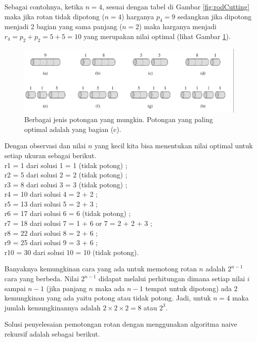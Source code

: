 Sebagai contohnya, ketika $n=4$, sesuai dengan tabel di Gambar \ref{fig:rodCutting} maka jika rotan tidak dipotong ($n=4$) harganya $p_4 = 9$ sedangkan jika dipotong menjadi 2 bagian yang sama panjang ($n=2$) maka harganya menjadi $r_4=p_2+p_2=5+5=10$ yang merupakan nilai optimal (lihat Gambar \ref{fig:rodCutting2}).   

\begin{figure}[H]%
\centering
\includegraphics[scale=0.7]{fig/rodCutting2.eps}%
\caption{Berbagai jenis potongan yang mungkin. Potongan yang paling optimal adalah yang bagian (c).}%
\label{fig:rodCutting2}%
\end{figure}

Dengan observasi dan nilai $n$ yang kecil kita bisa menentukan nilai optimal untuk setiap ukuran sebagai berikut. \\
r1 = 1 dari solusi 1 = 1 (tidak potong) ;\\
r2 = 5 dari solusi 2 = 2 (tidak potong) ;\\
r3 = 8 dari solusi 3 = 3 (tidak potong) ;\\
r4 = 10 dari solusi 4 = 2 + 2 ;\\
r5 = 13 dari solusi 5 = 2 + 3 ;\\
r6 = 17 dari solusi 6 = 6 (tidak potong) ;\\
r7 = 18 dari solusi 7 = 1 + 6 or 7 = 2 + 2 + 3 ;\\
r8 = 22 dari solusi 8 = 2 + 6 ;\\
r9 = 25 dari solusi 9 = 3 + 6 ;\\
r10 = 30 dari solusi 10 = 10 (tidak potong).

Banyaknya kemungkinan cara yang ada untuk memotong rotan $n$ adalah $2^{n-1}$ cara yang berbeda. Nilai $2^{n-1}$ didapat melalui perhitungan dimana setiap nilai $i$ sampai $n-1$ (jika panjang $n$ maka ada $n-1$ tempat untuk dipotong) ada 2 kemungkinan yang ada yaitu potong atau tidak potong. Jadi, untuk $n=4$ maka jumlah kemungkinannya adalah $2\times{}2\times{}2 = 8$ atau $2^3$. 

Solusi penyelesaian pemotongan rotan dengan menggunakan algoritma naive rekursif adalah sebagai berikut.

